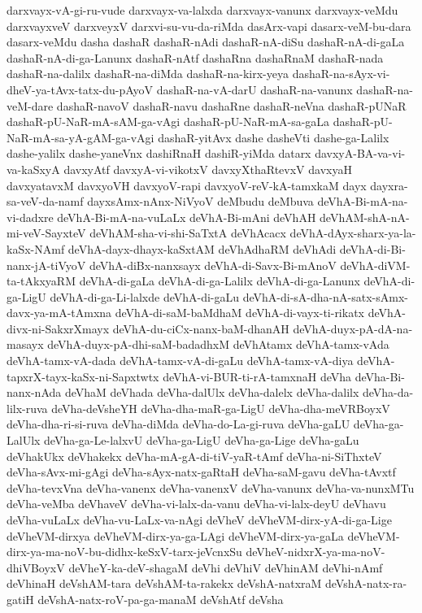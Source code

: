 {darxvayx-vA-gi-ru-vude
darxvayx-va-lalxda
darxvayx-vanunx
darxvayx-veMdu
darxvayxveV
darxveyxV
darxvi-su-vu-da-riMda
dasArx-vapi
dasarx-veM-bu-dara
dasarx-veMdu
dasha
dashaR
dashaR-nAdi
dashaR-nA-diSu
dashaR-nA-di-gaLa
dashaR-nA-di-ga-Lanunx
dashaR-nAtf
dashaRna
dashaRnaM
dashaR-nada
dashaR-na-dalilx
dashaR-na-diMda
dashaR-na-kirx-yeya
dashaR-na-sAyx-vi-dheV-ya-tAvx-tatx-du-pAyoV
dashaR-na-vA-darU
dashaR-na-vanunx
dashaR-na-veM-dare
dashaR-navoV
dashaR-navu
dashaRne
dashaR-neVna
dashaR-pUNaR
dashaR-pU-NaR-mA-sAM-ga-vAgi
dashaR-pU-NaR-mA-sa-gaLa
dashaR-pU-NaR-mA-sa-yA-gAM-ga-vAgi
dashaR-yitAvx
dashe
dasheVti
dashe-ga-Lalilx
dashe-yalilx
dashe-yaneVnx
dashiRnaH
dashiR-yiMda
datarx
davxyA-BA-va-vi-va-kaSxyA
davxyAtf
davxyA-vi-vikotxV
davxyXthaRtevxV
davxyaH
davxyatavxM
davxyoVH
davxyoV-rapi
davxyoV-reV-kA-tamxkaM
dayx
dayxra-sa-veV-da-namf
dayxsAmx-nAnx-NiVyoV
deMbudu
deMbuva
deVhA-Bi-mA-na-vi-dadxre
deVhA-Bi-mA-na-vuLaLx
deVhA-Bi-mAni
deVhAH
deVhAM-shA-nA-mi-veV-SayxteV
deVhAM-sha-vi-shi-SaTxtA
deVhAcacx
deVhA-dAyx-sharx-ya-la-kaSx-NAmf
deVhA-dayx-dhayx-kaSxtAM
deVhAdhaRM
deVhAdi
deVhA-di-Bi-nanx-jA-tiVyoV
deVhA-diBx-nanxsayx
deVhA-di-Savx-Bi-mAnoV
deVhA-diVM-ta-tAkxyaRM
deVhA-di-gaLa
deVhA-di-ga-Lalilx
deVhA-di-ga-Lanunx
deVhA-di-ga-LigU
deVhA-di-ga-Li-lalxde
deVhA-di-gaLu
deVhA-di-sA-dha-nA-satx-sAmx-davx-ya-mA-tAmxna
deVhA-di-saM-baMdhaM
deVhA-di-vayx-ti-rikatx
deVhA-divx-ni-SakxrXmayx
deVhA-du-ciCx-nanx-baM-dhanAH
deVhA-duyx-pA-dA-na-masayx
deVhA-duyx-pA-dhi-saM-badadhxM
deVhAtamx
deVhA-tamx-vAda
deVhA-tamx-vA-dada
deVhA-tamx-vA-di-gaLu
deVhA-tamx-vA-diya
deVhA-tapxrX-tayx-kaSx-ni-Sapxtwtx
deVhA-vi-BUR-ti-rA-tamxnaH
deVha
deVha-Bi-nanx-nAda
deVhaM
deVhada
deVha-dalUlx
deVha-dalelx
deVha-dalilx
deVha-da-lilx-ruva
deVha-deVsheYH
deVha-dha-maR-ga-LigU
deVha-dha-meVRBoyxV
deVha-dha-ri-si-ruva
deVha-diMda
deVha-do-La-gi-ruva
deVha-gaLU
deVha-ga-LalUlx
deVha-ga-Le-lalxvU
deVha-ga-LigU
deVha-ga-Lige
deVha-gaLu
deVhakUkx
deVhakekx
deVha-mA-gA-di-tiV-yaR-tAmf
deVha-ni-SiThxteV
deVha-sAvx-mi-gAgi
deVha-sAyx-natx-gaRtaH
deVha-saM-gavu
deVha-tAvxtf
deVha-tevxVna
deVha-vanenx
deVha-vanenxV
deVha-vanunx
deVha-va-nunxMTu
deVha-veMba
deVhaveV
deVha-vi-lalx-da-vanu
deVha-vi-lalx-deyU
deVhavu
deVha-vuLaLx
deVha-vu-LaLx-va-nAgi
deVheV
deVheVM-dirx-yA-di-ga-Lige
deVheVM-dirxya
deVheVM-dirx-ya-ga-LAgi
deVheVM-dirx-ya-gaLa
deVheVM-dirx-ya-ma-noV-bu-didhx-keSxV-tarx-jeVcnxSu
deVheV-nidxrX-ya-ma-noV-dhiVBoyxV
deVheY-ka-deV-shagaM
deVhi
deVhiV
deVhinAM
deVhi-nAmf
deVhinaH
deVshAM-tara
deVshAM-ta-rakekx
deVshA-natxraM
deVshA-natx-ra-gatiH
deVshA-natx-roV-pa-ga-manaM
deVshAtf
deVsha
}
